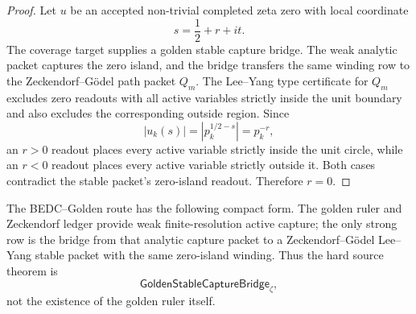 \begin{proof}
Let $u$ be an accepted non-trivial completed zeta zero with local
coordinate
$$
s=\frac12+r+it.
$$
The coverage target supplies a golden stable capture bridge. The weak
analytic packet captures the zero island, and the bridge transfers the
same winding row to the Zeckendorf--G\"odel path packet $Q_m$. The
Lee--Yang type certificate for $Q_m$ excludes zero readouts with all
active variables strictly inside the unit boundary and also excludes the
corresponding outside region. Since
$$
|u_k(s)|=|p_k^{1/2-s}|=p_k^{-r},
$$
an $r>0$ readout places every active variable strictly inside the unit
circle, while an $r<0$ readout places every active variable strictly
outside it. Both cases contradict the stable packet's zero-island
readout. Therefore $r=0$.
\end{proof}

\begin{principle}
\label{prin:rh-golden-blueprint}
The BEDC--Golden route has the following compact form. The golden ruler
and Zeckendorf ledger provide weak finite-resolution active capture; the
only strong row is the bridge from that analytic capture packet to a
Zeckendorf--G\"odel Lee--Yang stable packet with the same zero-island
winding. Thus the hard source theorem is
$$
\mathsf{GoldenStableCaptureBridge}_{\zeta},
$$
not the existence of the golden ruler itself.
\end{principle}
